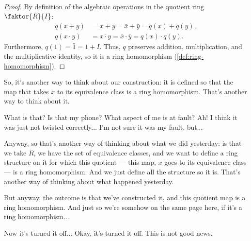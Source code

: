\begin{content}


\begin{proof}
By definition of the algebraic operations in the quotient ring $\faktor{R}{I}$:
\begin{align}
q(x + y) &= \overline{x + y} = \bar{x} + \bar{y} = q(x) + q(y), \label{eq:q-preserves-add} \\
q(x \cdot y) &= \overline{x \cdot y} = \bar{x} \cdot \bar{y} = q(x) \cdot q(y). \label{eq:q-preserves-mult}
\end{align}
Furthermore, $q(1) = \bar{1} = 1 + I$. Thus, $q$ preserves addition, multiplication, and the multiplicative identity, so it is a ring homomorphism (\cref{def:ring-homomorphism}).
\end{proof}
\end{content}

\begin{speech}[00:02:45 - 00:04:13]
So, it's another way to think about our construction: it is defined so that the map that takes $x$ to its equivalence class is a ring homomorphism. That's another way to think about it.

What is that? Is that my phone?  What aspect of me is at fault?  Ah! I think it was just not twisted correctly... I'm not sure it was my fault, but... 

Anyway, so that's another way of thinking about what we did yesterday: is that we take $R$, we have the set of equivalence classes, and we want to define a ring structure on it for which this quotient --- this map, $x$ goes to its equivalence class --- is a ring homomorphism. And we just define all the structure so it is. That's another way of thinking about what happened yesterday.

But anyway, the outcome is that we've constructed it, and this quotient map is a ring homomorphism. And just so we're somehow on the same page here, if it's a ring homomorphism...

Now it's turned it off...  Okay, it's turned it off. This is not good news.
\end{speech}


